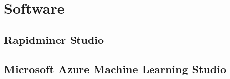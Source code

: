 %


%
%
\chapter{Software}
\label{sec:software}

\section{Rapidminer Studio}
\label{sec:software:rm}

\section{Microsoft Azure Machine Learning Studio}
\label{sec:software:msa}
